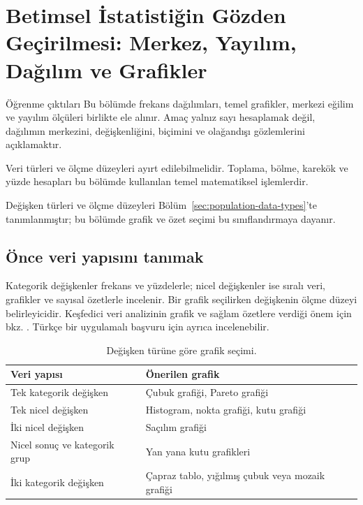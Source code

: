 \chapter{Betimsel İstatistiğin Gözden Geçirilmesi: Merkez, Yayılım, Dağılım ve Grafikler}
\label{ch:descriptive}

\begin{prismbox}[PrismLight]{Öğrenme çıktıları}
Bu bölümde frekans dağılımları, temel grafikler, merkezi eğilim ve yayılım
ölçüleri birlikte ele alınır. Amaç yalnız sayı hesaplamak değil, dağılımın
merkezini, değişkenliğini, biçimini ve olağandışı gözlemlerini açıklamaktır.
\end{prismbox}

\begin{prerequisitebox}
Veri türleri ve ölçme düzeyleri ayırt edilebilmelidir. Toplama, bölme,
karekök ve yüzde hesapları bu bölümde kullanılan temel matematiksel
işlemlerdir.
\end{prerequisitebox}

Değişken türleri ve ölçme düzeyleri Bölüm~\ref{sec:population-data-types}'te
tanımlanmıştır; bu bölümde grafik ve özet seçimi bu sınıflandırmaya dayanır.

\section{Önce veri yapısını tanımak}
\label{sec:descriptive-graphs}

Kategorik değişkenler frekans ve yüzdelerle; nicel değişkenler ise sıralı veri,
grafikler ve sayısal özetlerle incelenir. Bir grafik seçilirken değişkenin
ölçme düzeyi belirleyicidir. Keşfedici veri analizinin grafik ve sağlam
özetlere verdiği önem için bkz. \citet{tukey1977}.
Türkçe bir uygulamalı başvuru için ayrıca \citet{koklu2006} incelenebilir.

\begin{table}[H]
\centering
\caption{Değişken türüne göre grafik seçimi.}
\label{tab:graph-choice}
\begin{tabular}{p{}p{}}
\toprule
Veri yapısı & Önerilen grafik \\
\midrule
Tek kategorik değişken & Çubuk grafiği, Pareto grafiği \\
Tek nicel değişken & Histogram, nokta grafiği, kutu grafiği \\
İki nicel değişken & Saçılım grafiği \\
Nicel sonuç ve kategorik grup & Yan yana kutu grafikleri \\
İki kategorik değişken & Çapraz tablo, yığılmış çubuk veya mozaik grafiği \\
\bottomrule
\end{tabular}
\end{table}

